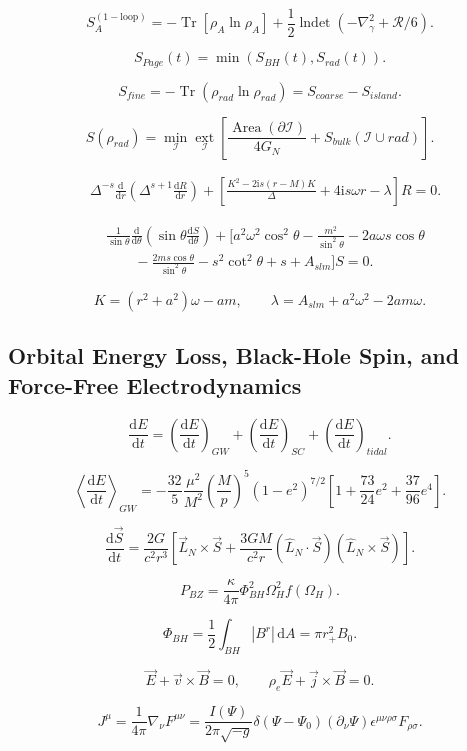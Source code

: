 \documentclass[11pt,a4paper]{article}
\newcommand{\R}{\mathcal{R}}
\newcommand{\I}{\mathcal{I}}
\newcommand{\Tr}{\operatorname{Tr}}
\newcommand{\Area}{\operatorname{Area}}
\newcommand{\lndet}{\operatorname{lndet}}
\newcommand{\ext}{\operatorname*{ext}}
\newcommand{\dd}{\mathrm{d}}
\newcommand{\ii}{\mathrm{i}}
\begin{document}
\[
S_A^{(1-\mathrm{loop})}
=-\Tr\left[\rho_A\ln\rho_A\right]
+\frac12\lndet\left(-\nabla_\gamma^2+\R/6\right).
\]

\[
S_{Page}(t)=\min\left(S_{BH}(t),S_{rad}(t)\right).
\]

\[
S_{fine}=-\Tr\left(\rho_{rad}\ln\rho_{rad}\right)
=S_{coarse}-S_{island}.
\]

\[
S(\rho_{rad})
=\min_{\I}\ext_{\I}
\left[\frac{\Area(\partial\I)}{4G_N}
+S_{bulk}(\I\cup rad)\right].
\]

\begin{align*}
&\Delta^{-s}\frac{\dd}{\dd r}
\left(\Delta^{s+1}\frac{\dd R}{\dd r}\right)
+\left[\frac{K^2-2\ii s(r-M)K}{\Delta}
+4\ii s\omega r-\lambda\right]R=0.
\end{align*}

\begin{align*}
&\frac{1}{\sin\theta}\frac{\dd}{\dd\theta}
\left(\sin\theta\frac{\dd S}{\dd\theta}\right)
+\Biggl[a^2\omega^2\cos^2\theta-\frac{m^2}{\sin^2\theta}
-2a\omega s\cos\theta\\
&\qquad-\frac{2ms\cos\theta}{\sin^2\theta}
-s^2\cot^2\theta+s+A_{slm}\Biggr]S=0.
\end{align*}

\[
K=(r^2+a^2)\omega-am,\qquad
\lambda=A_{slm}+a^2\omega^2-2am\omega.
\]

\subsection{Orbital Energy Loss, Black-Hole Spin, and Force-Free Electrodynamics}

\[
\frac{\dd E}{\dd t}
=\left(\frac{\dd E}{\dd t}\right)_{GW}
+\left(\frac{\dd E}{\dd t}\right)_{SC}
+\left(\frac{\dd E}{\dd t}\right)_{tidal}.
\]

\[
\left\langle\frac{\dd E}{\dd t}\right\rangle_{GW}
=-\frac{32}{5}\frac{\mu^2}{M^2}\left(\frac{M}{p}\right)^5
(1-e^2)^{7/2}
\left[1+\frac{73}{24}e^2+\frac{37}{96}e^4\right].
\]

\[
\frac{\dd\vec S}{\dd t}
=\frac{2G}{c^2r^3}\left[\vec L_N\times\vec S
+\frac{3GM}{c^2r}\left(\hat L_N\cdot\vec S\right)
\left(\hat L_N\times\vec S\right)\right].
\]

\[
P_{BZ}=\frac{\kappa}{4\pi}\Phi_{BH}^2\Omega_H^2f(\Omega_H).
\]

\[
\Phi_{BH}=\frac12\int_{BH}|B^r|\,\dd A=\pi r_+^2B_0.
\]

\[
\vec E+\vec v\times\vec B=0,\qquad
\rho_e\vec E+\vec j\times\vec B=0.
\]

\[
J^\mu=\frac{1}{4\pi}\nabla_\nu F^{\mu\nu}
=\frac{I(\Psi)}{2\pi\sqrt{-g}}\delta(\Psi-\Psi_0)
(\partial_\nu\Psi)\epsilon^{\mu\nu\rho\sigma}F_{\rho\sigma}.
\]
\end{document}
